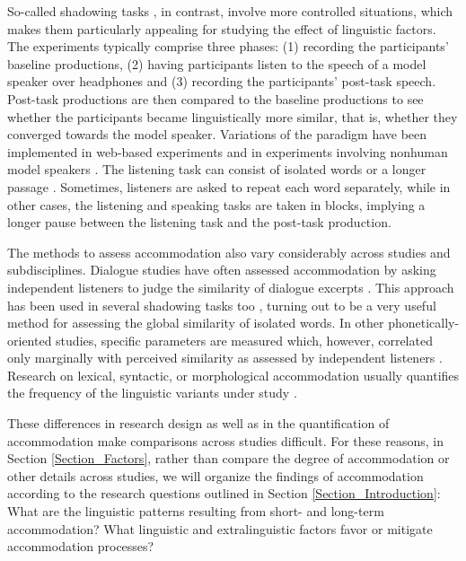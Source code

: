 \documentclass[output=paper]{langscibook}
\begin{document}
So-called shadowing tasks \citep{goldinger_echoes_1998,shockley_imitation_2004,babel_dialect_2010}, in contrast, involve more controlled situations, which makes them particularly appealing for studying the effect of linguistic factors. The experiments typically comprise three phases: (1) recording the participants' baseline productions, (2) having participants listen to the speech of a model speaker over headphones and (3) recording the participants' post-task speech. Post-task productions are then compared to the baseline productions to see whether the participants became linguistically more similar, that is, whether they converged towards the model speaker. Variations of the paradigm have been implemented in web-based experiments \citep{weatherholtz_socially-mediated_2014} and in experiments involving nonhuman model speakers \citep[e.g.][]{beckner_participants_2016}. The listening task can consist of isolated words \citep[e.g.][]{goldinger_echoes_1998} or a longer passage \citep[e.g.][]{yu_phonetic_2013,weatherholtz_socially-mediated_2014}. Sometimes, listeners are asked to repeat each word separately, while in other cases, the listening and speaking tasks are taken in blocks, implying a longer pause between the listening task and the post-task production.


The methods to assess accommodation also vary considerably across studies and subdisciplines. Dialogue studies have often assessed accommodation by asking independent listeners to judge the similarity of dialogue excerpts \citep{pardo_phonetic_2006,kim_phonetic_2013}. This approach has been used in several shadowing tasks too \citep[e.g.][]{goldinger_echoes_1998}, turning out to be a very useful method for assessing the global similarity of isolated words. In other phonetically-oriented studies, specific parameters are measured \citep[e.g.][]{babel_dialect_2010,de_looze_investigating_2014} which, however, correlated only marginally  with perceived similarity as assessed by independent listeners \citep{pardo_phonetic_2013,walker_repeat_2015,abel_cognitive_2016,pardo_phonetic_2017}. Research on lexical, syntactic, or morphological accommodation usually quantifies the frequency of the linguistic variants under study \citep[e.g.][]{beckner_participants_2016,weatherholtz_socially-mediated_2014}.

These differences in research design as well as in the quantification of accommodation make comparisons across studies difficult. For these reasons, in Section \ref{Section_Factors}, rather than compare the degree of accommodation or other details across studies, we will organize the findings of accommodation according to the research questions outlined in  Section \ref{Section_Introduction}: What are the linguistic patterns resulting from short- and long-term accommodation? What linguistic and extralinguistic factors favor or mitigate accommodation processes?
\end{document}
